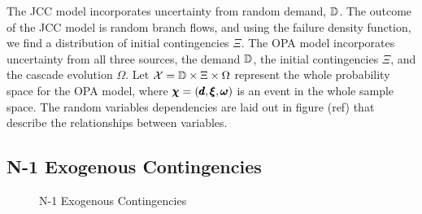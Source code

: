 The JCC model incorporates uncertainty from random demand, $\mathbb{D}$.  The outcome of the JCC model is random branch flows, and using the failure density function, we find a distribution of initial contingencies $\Xi$.  The OPA model incorporates uncertainty from all three sources, the demand $\mathbb{D}$, the initial contingencies $\Xi$, and the cascade evolution $\Omega$.  Let $\mathcal{X} = \mathbb{D} \times \Xi \times \Omega$ represent the whole probability space for the OPA model, where $\pmb{\chi} = (\pmb{d}, \pmb{\xi}, \pmb{\omega})$ is an event in the whole sample space.  The random variables dependencies are laid out in figure (ref) that describe the relationships between variables.



\subsection{N-1 Exogenous Contingencies}

\begin{figure}
\centering
{} 
\caption{N-1 Exogenous Contingencies}
\end{figure}


